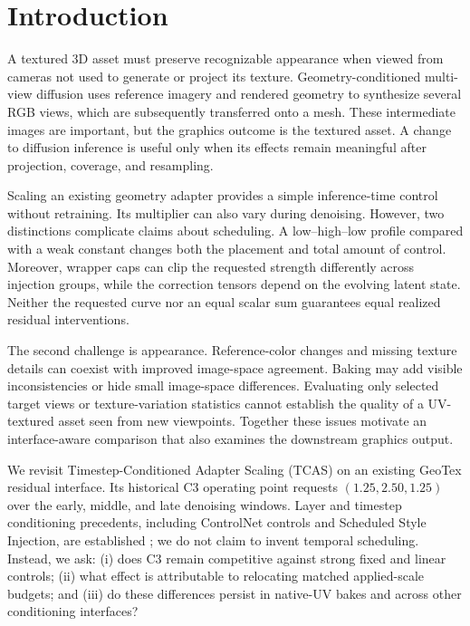 \documentclass[times,twocolumn,final]{elsarticle}
\begin{document}
\section{Introduction}
\label{sec:intro}

A textured 3D asset must preserve recognizable appearance when viewed from cameras not used to generate or project its texture. Geometry-conditioned multi-view diffusion uses reference imagery and rendered geometry to synthesize several RGB views, which are subsequently transferred onto a mesh. These intermediate images are important, but the graphics outcome is the textured asset. A change to diffusion inference is useful only when its effects remain meaningful after projection, coverage, and resampling.

Scaling an existing geometry adapter provides a simple inference-time control without retraining. Its multiplier can also vary during denoising. However, two distinctions complicate claims about scheduling. A low--high--low profile compared with a weak constant changes both the placement and total amount of control. Moreover, wrapper caps can clip the requested strength differently across injection groups, while the correction tensors depend on the evolving latent state. Neither the requested curve nor an equal scalar sum guarantees equal realized residual interventions.

The second challenge is appearance. Reference-color changes and missing texture details can coexist with improved image-space agreement. Baking may add visible inconsistencies or hide small image-space differences. Evaluating only selected target views or texture-variation statistics cannot establish the quality of a UV-textured asset seen from new viewpoints. Together these issues motivate an interface-aware comparison that also examines the downstream graphics output.

We revisit Timestep-Conditioned Adapter Scaling (TCAS) on an existing GeoTex residual interface. Its historical C3 operating point requests $(1.25,2.50,1.25)$ over the early, middle, and late denoising windows. Layer and timestep conditioning precedents, including ControlNet controls and Scheduled Style Injection, are established \cite{controlnet2023layercontrol,diffusers2023controlnet,kulkarni2026ssi}; we do not claim to invent temporal scheduling. Instead, we ask: (i) does C3 remain competitive against strong fixed and linear controls; (ii) what effect is attributable to relocating matched applied-scale budgets; and (iii) do these differences persist in native-UV bakes and across other conditioning interfaces?
\end{document}
